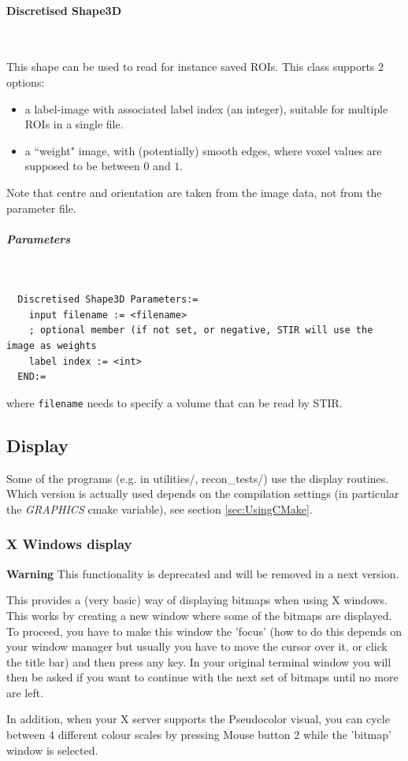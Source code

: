 \documentclass{article}
\newcommand{\subsubsubsection}[1]{\paragraph{#1}\mbox{} \\}
\newcommand{\subsubsubsubsection}[1]{\subparagraph{#1} \mbox{} \\}
\begin{document}
{{{{{{{ \subsubsubsection{Discretised Shape3D}
}
This shape can be used to read for instance saved ROIs. This class supports 2 options:
\begin{itemize}
  \item a label-image with associated label index (an integer), suitable for multiple ROIs in a single file.
  \item a ``weight" image, with (potentially) smooth edges, where voxel values
    are supposed to be between $0$ and $1$.
\end{itemize}
Note that centre and orientation are taken from the image data, not from the parameter file.
{ \subsubsubsubsection{Parameters}
}
\begin{verbatim}
  Discretised Shape3D Parameters:=
    input filename := <filename>
    ; optional member (if not set, or negative, STIR will use the image as weights
    label index := <int>
  END:=
\end{verbatim}
where \texttt{filename} needs to specify a volume that can be read by STIR.


\subsection{
Display}\label{sec:display}
Some of the programs (e.g. in utilities/, recon\_tests/) use 
the display routines. Which version is actually used depends 
on the compilation settings (in particular the \textit{GRAPHICS} cmake 
variable), see section \ref{sec:UsingCMake}. 


\subsubsection{
X Windows display}
\label{sec:displayX}
\textbf{Warning} This functionality is deprecated and will be removed in a next version.

This provides a (very basic) way of displaying bitmaps when using 
X windows. This works by creating a new window where some of 
the bitmaps are displayed. To proceed, you have to make this 
window the 'focus' (how to do this depends on your window manager 
but usually you have to move the cursor over it, or click the 
title bar) and then press any key. In your original terminal 
window you will then be asked if you want to continue with the 
next set of bitmaps until no more are left.


In addition, when your X server supports the Pseudocolor visual, 
you can cycle between 4 different colour scales by pressing Mouse 
button 2 while the 'bitmap' window is selected.


}}}}}}
\end{document}
